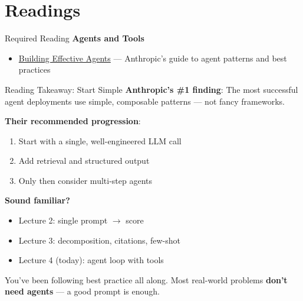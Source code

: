 \documentclass[aspectratio=169]{beamer}
\begin{document}
\section{Readings}

\begin{frame}{Required Reading}
\textbf{Agents and Tools}
\begin{itemize}
    \item \href{https://www.anthropic.com/engineering/building-effective-agents}{Building Effective Agents} --- Anthropic's guide to agent patterns and best practices
\end{itemize}
\end{frame}

\begin{frame}{Reading Takeaway: Start Simple}
\textbf{Anthropic's \#1 finding}: The most successful agent deployments use simple, composable patterns --- not fancy frameworks.
\vspace{0.3cm}

\textbf{Their recommended progression}:
\begin{enumerate}
    \item Start with a single, well-engineered LLM call
    \item Add retrieval and structured output
    \item Only then consider multi-step agents
\end{enumerate}
\vspace{0.3cm}

\textbf{Sound familiar?}
\begin{itemize}
    \item Lecture 2: single prompt $\rightarrow$ score
    \item Lecture 3: decomposition, citations, few-shot
    \item Lecture 4 (today): agent loop with tools
\end{itemize}
\vspace{0.3cm}

You've been following best practice all along. Most real-world problems \textbf{don't need agents} --- a good prompt is enough.
\end{frame}
\end{document}
